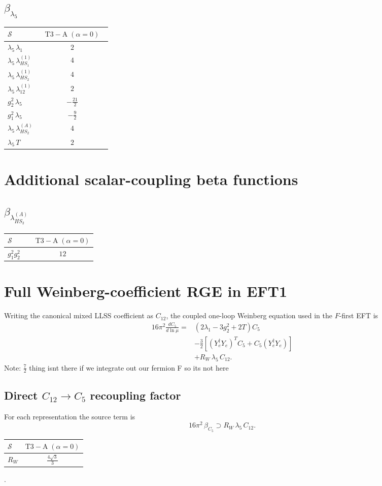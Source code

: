 \documentclass[9pt]{article}
\begin{document}
\subsection*{$ \beta_{\lambda_5} $}
\begin{longtable}{@{}p{0.31\linewidth}c@{}}
\toprule
$\mathcal{S}$ & $ \mathrm{T3-A}\;(\alpha=0) $ \\
\midrule
$ \lambda_5\,\lambda_1 $ & $ 2 $ \\
$ \lambda_5\,\lambda_{HS_1}^{(1)} $ & $ 4 $ \\
$ \lambda_5\,\lambda_{HS_2}^{(1)} $ & $ 4 $ \\
$ \lambda_5\,\lambda_{12}^{(1)} $ & $ 2 $ \\
$ g_2^2\,\lambda_5 $ & $ - \frac{21}{2} $ \\
$ g_1^2\,\lambda_5 $ & $ - \frac{9}{2} $ \\
$ \lambda_5\,\lambda_{HS_2}^{(A)} $ & $ 4 $ \\
$ \lambda_5\,T $ & $ 2 $ \\
\bottomrule
\end{longtable}
\section*{Additional scalar-coupling beta functions}
\subsection*{$ \beta_{\lambda_{HS_2}^{(A)}} $}
\begin{longtable}{@{}p{0.31\linewidth}c@{}}
\toprule
$\mathcal{S}$ & $ \mathrm{T3-A}\;(\alpha=0) $ \\
\midrule
$ g_1^2g_2^2 $ & $ 12 $ \\
\bottomrule
\end{longtable}

\section*{Full Weinberg-coefficient RGE in EFT1}
Writing the canonical mixed LLSS coefficient as $C_{12}$, the coupled one-loop Weinberg equation used in the $F$-first EFT is
\begin{align}
16\pi^2\frac{dC_5}{d\ln\mu}={}&(2\lambda_1-3g_2^2+2T)C_5\\
&-\frac32\left[(Y_e^\dagger Y_e)^T C_5+C_5(Y_e^\dagger Y_e)\right]\\
&+R_W\,\lambda_5\,C_{12}.
\end{align}
Note: $\frac{7}{2}$ thing isnt there if we integrate out our fermion F so its not here \subsection*{Direct $C_{12}\to C_5$ recoupling factor}
For each representation the source term is
\[16\pi^2\,\beta_{C_5}\supset R_W\,\lambda_5\,C_{12}.\]
\begin{longtable}{@{}lc@{}}
\toprule
$\mathcal{S}$ & $ \mathrm{T3-A}\;(\alpha=0) $ \\
\midrule
$R_W$ & $ \frac{4 \sqrt{3}}{3} $ \\
\bottomrule
\end{longtable}
.
\end{document}
